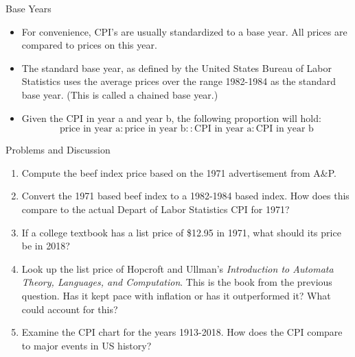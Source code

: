 \documentclass[]{beamer}
\begin{document}
\begin{frame}{Base Years}
\begin{itemize}[<+->]
\item For convenience, CPI's are usually standardized to a base year.  All prices are compared to prices on this year.
\item The standard base year, as defined by the United States Bureau of Labor Statistics uses the average prices over the range 1982-1984 as the standard base year.  (This is called a chained base year.)
\item Given the CPI in year a and year b, the following proportion will hold:
\[
\textrm{price in year a} : \textrm{price in year b} :: \textrm{CPI in year a} : \textrm{CPI in year b}
\]
\end{itemize}
\end{frame}

\begin{frame}{Problems and Discussion}
\begin{enumerate}[<+->]
\item Compute the beef index price based on the 1971 advertisement from A\&P.  
\item Convert the 1971 based beef index to a 1982-1984 based index.  How does this compare to the actual Depart of Labor Statistics CPI for 1971?
\item If a college textbook has a list price of \$12.95 in 1971, what should its price be in 2018?
\item Look up the list price of Hopcroft and Ullman's {\em Introduction to Automata Theory, Languages, and Computation}.  This is the book from the previous question.  Has it kept pace with inflation or has it outperformed it?  What could account for this?
\item Examine the CPI chart for the years 1913-2018.  How does the CPI compare to major events in US history?
\end{enumerate}
\end{frame}
\end{document}

